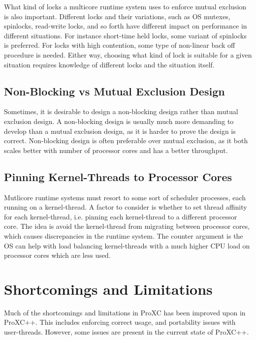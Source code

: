 What kind of locks a multicore runtime system uses to enforce mutual exclusion is also important. Different locks and their variations, such as OS mutexes, spinlocks, read\hyp{}write locks, and so forth have different impact on performance in different situations. For instance short\hyp{}time held locks, some variant of spinlocks is preferred. For locks with high contention, some type of non\hyp{}linear back off procedure is needed. Either way, choosing what kind of lock is suitable for a given situation requires knowledge of different locks and the situation itself.

\section{Non\hyp{}Blocking vs Mutual Exclusion Design}

Sometimes, it is desirable to design a non\hyp{}blocking design rather than mutual exclusion design. A non\hyp{}blocking design is usually much more demanding to develop than a mutual exclusion design, as it is harder to prove the design is correct. Non\hyp{}blocking design is often preferable over mutual exclusion, as it both scales better with number of processor cores and has a better throughput. 

\section{Pinning Kernel\hyp{}Threads to Processor Cores}

Mutlicore runtime systems must resort to some sort of scheduler processes, each running on a kernel\hyp{}thread. A factor to consider is whether to set thread affinity for each kernel\hyp{}thread, i.e. pinning each kernel\hyp{}thread to a different processor core. The idea is avoid the kernel\hyp{}thread from migrating between processor cores, which causes discrepancies in the runtime system. The counter argument is the OS can help with load balancing kernel\hyp{}threads with a much higher CPU load on processor cores which are less used. 


\chapter{Shortcomings and Limitations}
\label{ch:shortcomings_limitations}

Much of the shortcomings and limitations in ProXC has been improved upon in ProXC++. This includes enforcing correct usage, and portability issues with user\hyp{}threads. However, some issues are present in the current state of ProXC++.


